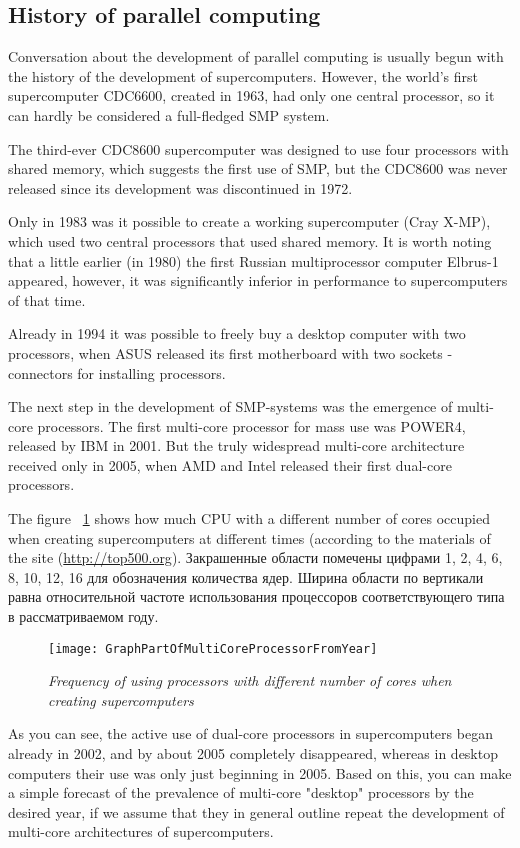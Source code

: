 { %
	\subsection{History of parallel computing}
	\par Conversation about the development of parallel computing is usually begun with the history of the development of supercomputers. However, the world's first supercomputer CDC6600, created in 1963, had only one central processor, so it can hardly be considered a full-fledged SMP system.
	\par The third-ever CDC8600 supercomputer was designed to use four processors with shared memory, which suggests the first use of SMP, but the CDC8600 was never released since its development was discontinued in 1972.
	\par Only in 1983 was it possible to create a working supercomputer (Cray X-MP), which used two central processors that used shared memory. It is worth noting that a little earlier (in 1980) the first Russian multiprocessor computer Elbrus-1 appeared, however, it was significantly inferior in performance to supercomputers of that time.
	\par Already in 1994 it was possible to freely buy a desktop computer with two processors, when ASUS released its first motherboard with two sockets - connectors for installing processors.
	\par The next step in the development of SMP-systems was the emergence of multi-core processors. The first multi-core processor for mass use was POWER4, released by IBM in 2001. But the truly widespread multi-core architecture received only in 2005, when AMD and Intel released their first dual-core processors.
	\par The figure ~\ref{GraphPartOfMultiCoreProcessorFromYear:image} shows how much CPU with a different number of cores occupied when creating supercomputers at different times (according to the materials of the site (\url{http://top500.org}). Закрашенные области помечены цифрами 1, 2, 4, 6, 8, 10, 12, 16 для обозначения количества ядер. Ширина области по вертикали равна относительной частоте использования процессоров соответствующего типа в рассматриваемом году.
	\begin{figure}[H]
		\texttt{[image: GraphPartOfMultiCoreProcessorFromYear]}
		\caption{\textit{Frequency of using processors with different number of cores when creating supercomputers}}
		\label{GraphPartOfMultiCoreProcessorFromYear:image}
	\end{figure}
	\par As you can see, the active use of dual-core processors in supercomputers began already in 2002, and by about 2005 completely disappeared, whereas in desktop computers their use was only just beginning in 2005. Based on this, you can make a simple forecast of the prevalence of multi-core "desktop" processors by the desired year, if we assume that they in general outline repeat the development of multi-core architectures of supercomputers.
	\par
}
